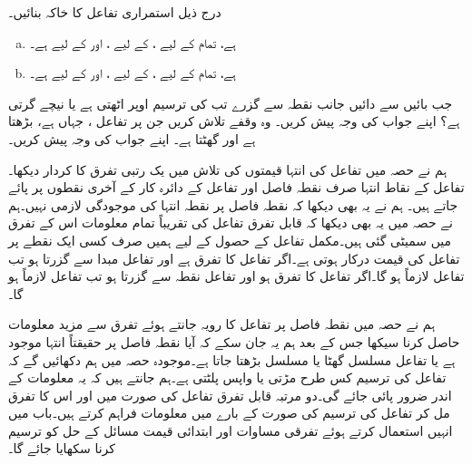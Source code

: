 درج ذیل استمراری تفاعل  کا خاکہ بنائیں۔
\begin{enumerate}[a.]
\item
{} ہے، تمام  کے لیے ،  کے لیے ، اور  کے لیے  ہے۔
\item
{} ہے، تمام  کے لیے ،  کے لیے ، اور  کے لیے  ہے۔ 
\end{enumerate}
جب  بائیں سے دائیں جانب نقطہ  سے گزرے تب  کی ترسیم اوپر اٹھتی ہے یا نیچے گرتی ہے؟ اپنے جواب کی وجہ پیش کریں۔
وہ وقفے تلاش کریں جن پر تفاعل ، جہاں  ہے، بڑھتا ہے اور گھٹتا ہے۔ اپنے جواب کی وجہ پیش کریں۔





ہم نے حصہ  میں تفاعل کی انتہا  قیمتوں کی تلاش میں یک رتبی تفرق کا کردار دیکھا۔ تفاعل کے   نقاط انتہا صرف نقطہ فاصل اور تفاعل  کے دائرہ کار کے آخری نقطوں  پر پائے جاتے ہیں۔ ہم نے یہ بھی دیکھا کہ نقطہ فاصل پر نقطہ انتہا کی موجودگی لازمی نہیں۔ہم نے حصہ  میں یہ بھی دیکھا کہ قابل تفرق تفاعل کی تقریباً تمام معلومات اس کے تفرق میں سمیٹی گئی ہیں۔مکمل تفاعل کے حصول کے لیے  ہمیں صرف کسی ایک نقطے  پر تفاعل کی قیمت درکار ہوتی ہے۔اگر تفاعل کا تفرق  ہے اور تفاعل مبدا سے گزرتا ہو تب تفاعل لازماً  ہو گا۔اگر تفاعل کا تفرق  ہو اور تفاعل نقطہ  سے گزرتا ہو تب تفاعل لازماً   ہو گا۔

ہم نے حصہ  میں نقطہ فاصل پر تفاعل کا رویہ جانتے ہوئے   تفرق سے مزید معلومات حاصل کرنا سیکھا جس کے بعد ہم یہ جان سکے کہ آیا نقطہ فاصل پر حقیقتاً انتہا موجود ہے یا تفاعل مسلسل گھٹا یا مسلسل بڑھتا جاتا ہے۔موجودہ حصہ میں ہم  دکھائیں گے کہ تفاعل  کی ترسیم  کس طرح مڑتی یا واپس پلٹتی ہے۔ہم جانتے ہیں کہ یہ معلومات  کے اندر ضرور  پائی جائے گی۔دو مرتبہ قابل تفرق تفاعل کی صورت میں   اور اس کا تفرق  مل کر تفاعل کی ترسیم کی صورت کے بارے میں معلومات فراہم کرتے ہیں۔باب  میں  انہیں استعمال کرتے ہوئے تفرقی مساوات اور ابتدائی قیمت مسائل کے حل کو ترسیم کرنا سکھایا جائے گا۔

